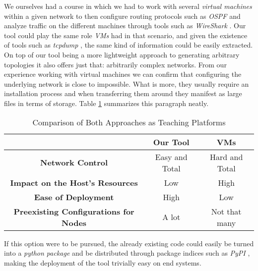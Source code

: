             We ourselves had a course in which we had to work with several \textit{virtual machines} within a given network to then configure routing protocols such as \textit{OSPF} \cite{bib:rfc2328} and analyze traffic on the different machines through tools such as \textit{WireShark} \cite{bib:wireshark}. Our tool could play the same role \textit{VMs} had in that scenario, and given the existence of tools such as \textit{tcpdump} \cite{bib:man-tcpdump}, the same kind of information could be easily extracted. On top of our tool being a more lightweight approach to generating arbitrary topologies it also offers just that: arbitrarily complex networks. From our experience working with virtual machines we can confirm that configuring the underlying network is close to impossible. What is more, they usually require an installation process and when transferring them around they manifest as large files in terms of storage. Table \ref{tab:tool-vs-vm} summarizes this paragraph neatly.\\

            \begin{table}
                \centering
                \begin{tabular}{|c|c|c|}
                    \cline{2-3}
                    \multicolumn{1}{l}{} & \multicolumn{1}{|c|}{\textbf{Our Tool}} & \textbf{VMs}\\
                    \hline
                    \textbf{Network Control} & Easy and Total & Hard and Total\\
                    \hline
                    \textbf{Impact on the Host's Resources} & Low & High\\
                    \hline
                    \textbf{Ease of Deployment} & High & Low\\
                    \hline
                    \textbf{Preexisting Configurations for Nodes} & A lot & Not that many\\
                    \hline
                \end{tabular}
                \caption[Our Tool vs. VMs]{Comparison of Both Approaches as Teaching Platforms}
                \label{tab:tool-vs-vm}
            \end{table}

            If this option were to be pursued, the already existing code could easily be turned into a \textit{python package} \cite{bib:python-import} and be distributed through package indices such as \textit{PyPI} \cite{bib:pypi}, making the deployment of the tool trivially easy on end systems.\\
